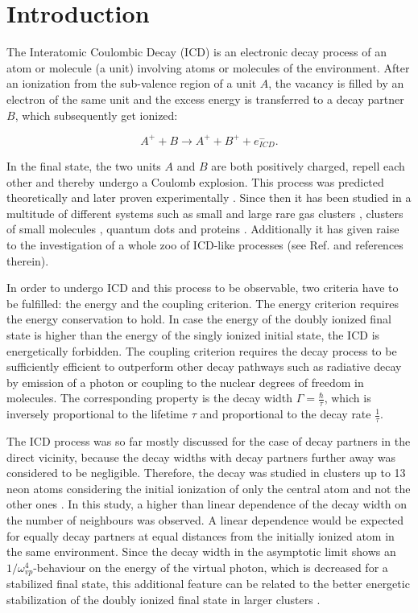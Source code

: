 \section{Introduction}

The Interatomic Coulombic Decay (ICD) is an electronic decay process of an atom or
molecule (a unit) involving atoms or molecules of the environment. After an
ionization from the sub-valence region of a unit $A$, the vacancy is filled
by an electron of the same unit and the excess energy is transferred to a decay
partner $B$, which subsequently get ionized:

\begin{equation*}
 A^+ + B \rightarrow A^+ + B^+ + e^-_{ICD}  .
\end{equation*}

In the final state,
the two units $A$ and $B$ are both positively charged, repell each other and
thereby undergo a Coulomb explosion. This process was predicted theoretically
\cite{Cederbaum97} and later proven experimentally \cite{Marburger03}. Since then
it has been studied in a multitude of different systems such as small and large
rare gas clusters \cite{many,Fasshauer14_1},
clusters of small molecules \cite{},
quantum dots \cite{Bande13}
and proteins \cite{Harbach13}. Additionally it has given raise to
the investigation of a whole zoo of ICD-like processes (see Ref.
\cite{Hergenhahn11,Jahnke15}
and references therein).

In order to undergo ICD and this process to be observable, two criteria have to
be fulfilled: the energy and the coupling criterion. The energy criterion
requires the energy conservation to hold. In case the energy of the
doubly ionized final
state is higher than the energy of the singly ionized initial state, the ICD
is energetically forbidden. The coupling criterion requires the decay
process to be sufficiently efficient to outperform other decay pathways
such as radiative decay by emission of a photon or coupling to the nuclear
degrees of freedom in molecules. The corresponding property is the
decay width $\Gamma = \frac{\hbar}{\tau}$, which is inversely proportional
to the lifetime $\tau$ and proportional to the decay rate $\frac{1}{\tau}$.

The ICD process was so far mostly discussed for the case of decay partners in
the direct vicinity, because the decay widths with decay partners further away
was considered to be negligible. Therefore, the decay was studied in clusters
up to 13 neon atoms considering the initial ionization of only the central
atom and not the other ones \cite{Santra01_3}. In this study, a higher than
linear dependence of the decay width on the number of neighbours was
observed. A linear dependence would be expected for equally decay partners
at equal distances from the initially ionized atom in the same environment.
Since the decay width in the asymptotic limit shows an 
$1/\omega^{4}_{vp}$-behaviour on the energy of the virtual photon, which
is decreased for a stabilized final state, this additional feature
can be related to
the better energetic stabilization of the doubly ionized
final state in larger clusters \cite{Fasshauer13}.

